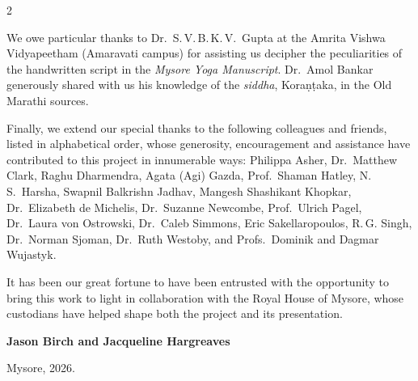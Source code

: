 \begin{nohyp}
\begin{multicols*}{2}
\begin{eng}
We owe particular thanks to Dr.~S.\,V.\,B.\,K.\,V.\ Gupta at the Amrita
Vishwa Vidyapeetham (Amaravati campus) for assisting us decipher the
peculiarities of the handwritten script in the \emph{Mysore Yoga
Manuscript}. Dr.~Amol Bankar generously shared with us his knowledge of
the \emph{siddha}, Koraṇṭaka, in the Old Marathi sources.

Finally, we extend our special thanks to the following colleagues and
friends, listed in alphabetical order, whose generosity, encouragement
and assistance have contributed to this project in innumerable ways:
Philippa Asher, Dr.~Matthew Clark, Raghu Dharmendra, Agata (Agi) Gazda,
Prof.~Shaman Hatley, N.\,S.\ Harsha, Swapnil Balkrishn Jadhav, Mangesh Shashikant Khopkar, 
Dr.~Elizabeth de Michelis, Dr.~Suzanne Newcombe, Prof.~Ulrich Pagel, Dr.~Laura
von Ostrowski, Dr.~Caleb Simmons, Eric Sakellaropoulos, R.\,G. Singh, 
Dr.~Norman Sjoman, Dr.~Ruth Westoby, and Profs.~Dominik and Dagmar Wujastyk.

It has been our great fortune to have been entrusted with the
opportunity to bring this work to light in collaboration with the Royal
House of Mysore, whose custodians have helped shape both the project and
its presentation.
\bigskip

\hfill \textbf{Jason Birch and Jacqueline Hargreaves}

\hfill Mysore, 2026.
\end{eng}
\end{multicols*}
\end{nohyp}
